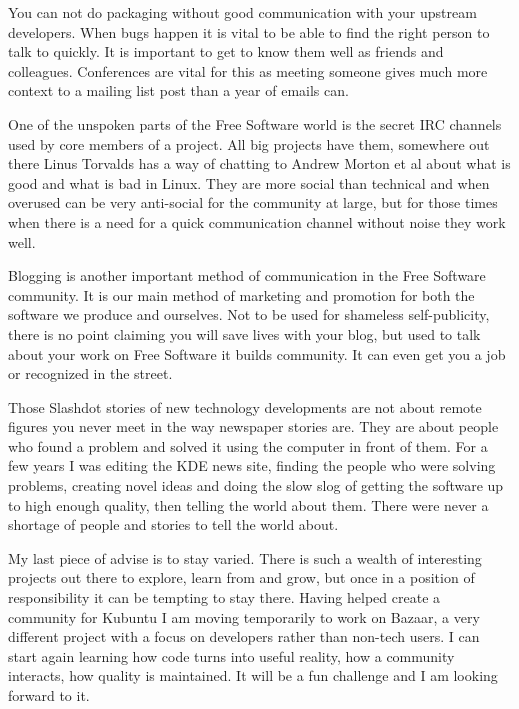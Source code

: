 You can not do packaging without good communication with your upstream
developers. When bugs happen it is vital to be able to find the right person to
talk to quickly. It is important to get to know them well as friends and
colleagues. Conferences are vital for this as meeting someone gives much more
context to a mailing list post than a year of emails can. 

One of the unspoken parts of the Free Software world is the secret IRC channels
used by core members of a project. All big projects have them, somewhere out
there Linus Torvalds has a way of chatting to Andrew Morton et al about what is
good and what is bad in Linux. They are more social than technical and when
overused can be very anti-social for the community at large, but for those times
when there is a need for a quick communication channel without noise they work
well.

Blogging is another important method of communication in the Free Software
community. It is our main method of marketing and promotion for both the
software we produce and ourselves. Not to be used for shameless self-publicity,
there is no point claiming you will save lives with your blog, but used to talk
about your work on Free Software it builds community. It can even get you a job
or recognized in the street.

Those Slashdot stories of new technology developments are not about remote
figures you never meet in the way newspaper stories are. They are about people
who found a problem and solved it using the computer in front of them. For a few
years I was editing the KDE news site, finding the people who were solving
problems, creating novel ideas and doing the slow slog of getting the software
up to high enough quality, then telling the world about them. There were never a
shortage of people and stories to tell the world about. 

My last piece of advise is to stay varied. There is such a wealth of interesting
projects out there to explore, learn from and grow, but once in a position of
responsibility it can be tempting to stay there. Having helped create a
community for Kubuntu I am moving temporarily to work on Bazaar, a very
different project with a focus on developers rather than non-tech users. I can
start again learning how code turns into useful reality, how a community
interacts, how quality is maintained. It will be a fun challenge and I am
looking forward to it.
